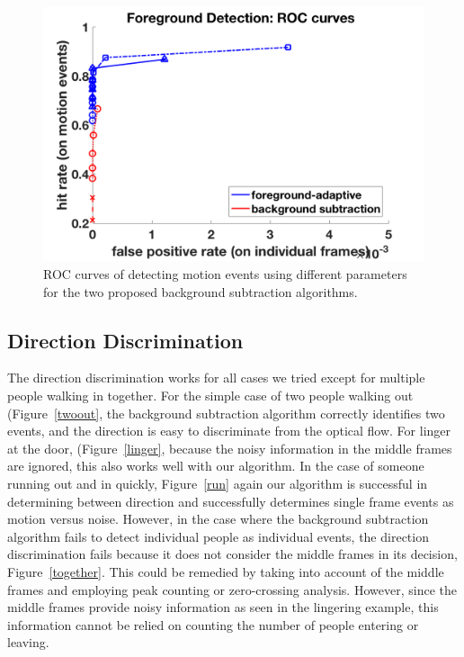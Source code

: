 \documentclass[12pt,oneside]{article} %
\begin{document}
\begin{figure}[htb]
\centering
\includegraphics[scale=0.52]{images/roc.png}
\caption{ROC curves of detecting motion events using different parameters for the two proposed
background subtraction algorithms.}
\label{roc}
\end{figure}

\subsection{Direction Discrimination}  %
The direction discrimination works for all cases we tried except for multiple people walking in together. For the simple case of two people walking out (Figure~\ref{twoout}, the background subtraction algorithm correctly identifies two events, and the direction is easy to discriminate from the optical flow. For linger at the door, (Figure~\ref{linger}, because the noisy information in the middle frames are ignored, this also works well with our algorithm. In the case of someone running out and in quickly, Figure~\ref{run} again our algorithm is successful in determining between direction and successfully determines single frame events as motion versus noise. However, in the case where the background subtraction algorithm fails to detect individual people as individual events, the direction discrimination fails because it does not consider the middle frames in its decision, Figure~\ref{together}. This could be remedied by taking into account of the middle frames and employing peak counting or zero-crossing analysis. However, since the middle frames provide noisy information as seen in the lingering example, this information cannot be relied on counting the number of people entering or leaving. 
\end{document}
